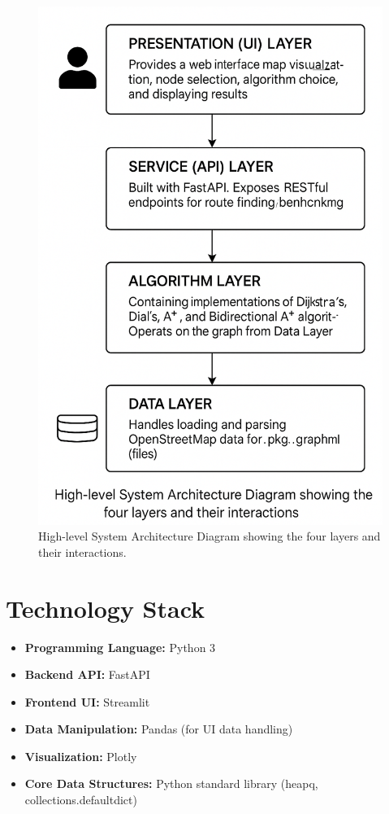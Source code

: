 \documentclass[12pt, a4paper]{report}
\begin{document}
\begin{figure}[h!]
    \centering
    \includegraphics[width=0.9\linewidth]{figures/architecture.png}
    \caption{High-level System Architecture Diagram showing the four layers and their interactions.}
    \label{fig:arch}
\end{figure}

\section{Technology Stack}
\begin{itemize}
    \item \textbf{Programming Language:} Python 3
    \item \textbf{Backend API:} FastAPI
    \item \textbf{Frontend UI:} Streamlit
    \item \textbf{Data Manipulation:} Pandas (for UI data handling)
    \item \textbf{Visualization:} Plotly
    \item \textbf{Core Data Structures:} Python standard library (heapq, collections.defaultdict)
\end{itemize}
\end{document}

